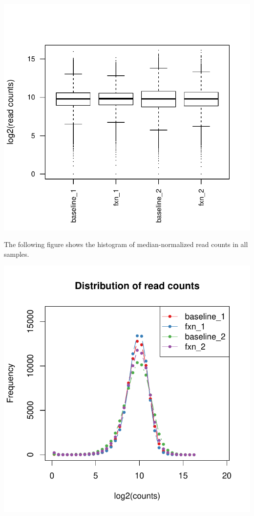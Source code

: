 \documentclass{article}
\begin{document}
\includegraphics{count_20200409__countsummary-005}

The following figure shows the histogram of median-normalized read counts in all samples.


\includegraphics{count_20200409__countsummary-006}
\end{document}
